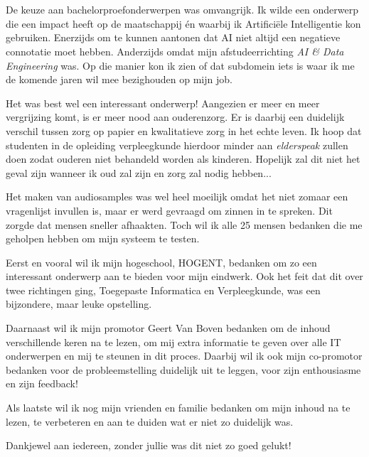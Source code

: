 
\chapter*{}
\label{ch:voorwoord}


De keuze aan bachelorproefonderwerpen was omvangrijk. Ik wilde een onderwerp die een impact heeft op de maatschappij én waarbij ik Artificiële Intelligentie kon gebruiken. Enerzijds om te kunnen aantonen dat AI niet altijd een negatieve connotatie moet hebben. Anderzijds omdat mijn afstudeerrichting \textit{AI \& Data Engineering} was. Op die manier kon ik zien of dat subdomein iets is waar ik me de komende jaren wil mee bezighouden op mijn job.

Het was best wel een interessant onderwerp! Aangezien er meer en meer vergrijzing komt, is er meer nood aan ouderenzorg. Er is daarbij een duidelijk verschil tussen zorg op papier en kwalitatieve zorg in het echte leven. Ik hoop dat studenten in de opleiding verpleegkunde hierdoor minder aan \textit{elderspeak} zullen doen zodat ouderen niet behandeld worden als kinderen. Hopelijk zal dit niet het geval zijn wanneer ik oud zal zijn en zorg zal nodig hebben...


Het maken van audiosamples was wel heel moeilijk omdat het niet zomaar een vragenlijst invullen is, maar er werd gevraagd om zinnen in te spreken. Dit zorgde dat mensen sneller afhaakten. Toch wil ik alle 25 %
mensen bedanken die me geholpen hebben om mijn systeem te testen.

Eerst en vooral wil ik mijn hogeschool, HOGENT, bedanken om zo een interessant onderwerp aan te bieden voor mijn eindwerk. Ook het feit dat dit over twee richtingen ging, Toegepaste Informatica en Verpleegkunde, was een bijzondere, maar leuke opstelling.

Daarnaast wil ik mijn promotor Geert Van Boven bedanken om de inhoud verschillende keren na te lezen, om mij extra informatie te geven over alle IT onderwerpen en mij te steunen in dit proces.
Daarbij wil ik ook mijn co-promotor bedanken voor de probleemstelling duidelijk uit te leggen, voor zijn enthousiasme en zijn feedback!

Als laatste wil ik nog mijn vrienden en familie bedanken om mijn inhoud na te lezen, te verbeteren en aan te duiden wat er niet zo duidelijk was.

Dankjewel aan iedereen, zonder jullie was dit niet zo goed gelukt!
